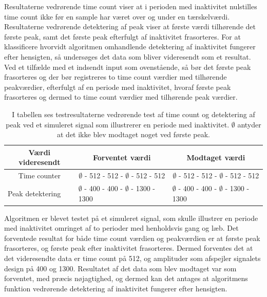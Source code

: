 Resultaterne vedrørende time count viser at i perioden med inaktivitet nulstilles time count ikke før en sample har været over og under en tærskelværdi. Resultaterne vedrørende detektering af peak viser at første værdi tilhørende det første peak, samt det første peak efterfulgt af inaktivitet frasorteres. For at klassificere hvorvidt algoritmen omhandlende detektering af inaktivitet fungerer efter hensigten, så undersøges det data som bliver videresendt som et resultat. Ved et tilfælde med et indsendt input som ovenstående, så bør det første peak frasorteres og der bør registreres to time count værdier med tilhørende peakværdier, efterfulgt af en periode med inaktivitet, hvoraf første peak frasorteres og dermed to time count værdier med tilhørende peak værdier.

\begin{table}[H]
	\centering
	\begin{tabular}{ccc}
		\hline
		\rowcolor[HTML]{C0C0C0} 
		Værdi videresendt & Forventet værdi & Modtaget værdi \\ \hline
		Time counter & $\emptyset$ - 512 - 512 - $\emptyset$ - 512 - 512 & $\emptyset$ - 512 - 512 - $\emptyset$ - 512 - 512 \\ \hline
		\multicolumn{1}{l}{Peak detektering} & \multicolumn{1}{l}{$\emptyset$ - 400 - 400 - $\emptyset$ - 1300 - 1300} & \multicolumn{1}{l}{$\emptyset$ - 400 - 400 - $\emptyset$ - 1300 - 1300} \\ \hline
	\end{tabular}
	\caption{I tabellen ses testresultaterne vedrørende test af time count og detektering af peak ved et simuleret signal som illustrerer en periode med inaktivitet. $\emptyset$ antyder at det ikke blev modtaget noget ved første peak.}
	\label{tab:test_inaktiv}
\end{table}\vspace{-0.5cm}
Algoritmen er blevet testet på et simuleret signal, som skulle illustrer en periode med inaktivitet omringet af to perioder med henholdsvis gang og læb. Det forventede resultat for både time count værdien og peakværdien er at første peak frasorteres, og første peak efter inaktivitet frasorteres. Dermed forventes det at det videresendte data er time count på 512, og amplituder som afspejler signalets design på 400 og 1300. Resultatet af det data som blev modtaget var som forventet, med præcis nøjagtighed, og dermed kan det antages at algoritmens funktion vedrørende detektering af inaktivitet fungerer efter hensigten. 


